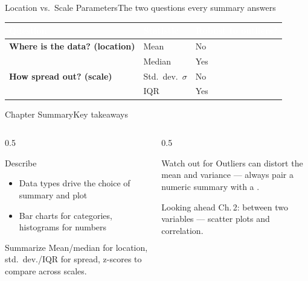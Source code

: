 \documentclass[aspectratio=169,11pt]{beamer}
\begin{document}
\begin{frame}{Location vs.\ Scale Parameters}{The two questions every summary answers}
  \small
  \renewcommand{\arraystretch}{1.3}
  \begin{center}
  \begin{tabularx}{\textwidth}{@{}>{\bfseries}l l >{\raggedright\arraybackslash}X@{}}
    \toprule
    \rowcolor{PrimaryDark}
    \textcolor{white}{Question} & \textcolor{white}{Statistic} & \textcolor{white}{Robust to outliers?} \\
    \midrule
    Where is the data? (location) & Mean & No \\
    \rowcolor{PrimaryLight!25}
     & Median & Yes \\
    How spread out? (scale) & Std.\ dev.\ $\sigma$ & No \\
    \rowcolor{PrimaryLight!25}
     & IQR & Yes \\
    \bottomrule
  \end{tabularx}
  \end{center}
\end{frame}

\begin{frame}{Chapter Summary}{Key takeaways}
  \begin{columns}[T]
    \begin{column}{0.5\textwidth}
      \begin{block}{Describe}
        \small
        \begin{itemize}
          \item Data types drive the choice of summary and plot
          \item Bar charts for categories, histograms for numbers
        \end{itemize}
      \end{block}
      \begin{exampleblock}{Summarize}
        \small Mean/median for location, std.\ dev./IQR for spread,
        z-scores to compare across scales.
      \end{exampleblock}
    \end{column}
    \begin{column}{0.5\textwidth}
      \begin{alertblock}{Watch out for}
        \small Outliers can distort the mean and variance — always pair a
        numeric summary with a .
      \end{alertblock}
      \begin{block}{Looking ahead}
        \small Ch.\,2:  between two variables —
        scatter plots and correlation.
      \end{block}
    \end{column}
  \end{columns}
\end{frame}
\end{document}
